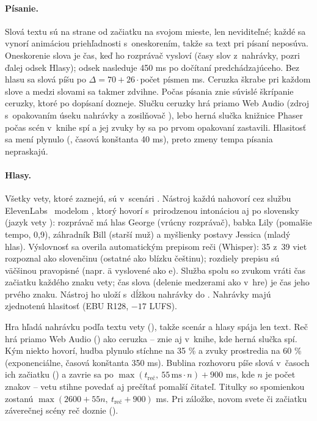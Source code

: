 \documentclass[11pt, a4paper]{article}
\begin{document}
\paragraph{Písanie.} Slová textu sú na strane od začiatku na svojom mieste, len neviditeľné;
každé sa vynorí animáciou priehľadnosti s~oneskorením, takže sa text pri písaní neposúva.
Oneskorenie slova je čas, keď ho rozprávač vysloví (časy slov z~nahrávky, pozri ďalej odsek
Hlasy); odsek nasleduje 450 ms po dočítaní predchádzajúceho. Bez hlasu sa slová píšu po
$\Delta = 70 + 26\cdot\text{počet písmen}$ ms. Ceruzka škrabe pri každom slove a medzi slovami
sa takmer zdvihne. Počas písania
znie súvislé škrípanie ceruzky, ktoré po dopísaní dozneje. Slučku ceruzky hrá priamo Web Audio
(zdroj  s~opakovaním úseku nahrávky a zosilňovač ),
lebo herná slučka knižnice Phaser počas scén v~knihe spí a jej zvuky by sa po prvom opakovaní
zastavili. Hlasitosť sa mení plynulo (, časová konštanta 40 ms), preto
zmeny tempa písania nepraskajú.

\paragraph{Hlasy.} Všetky vety, ktoré zaznejú, sú v~scenári . Nástroj
 každú nahovorí cez službu ElevenLabs~\cite{ElevenLabs} modelom
, ktorý hovorí s~prirodzenou intonáciou aj po slovensky (jazyk vety
): rozprávač má hlas George (vrúcny rozprávač), babka Lily (pomalšie tempo, 0,9),
záhradník Bill (starší muž) a myšlienky postavy Jessica (mladý hlas). Výslovnosť sa overila
automatickým prepisom reči (Whisper): 35 z~39 viet rozpoznal ako slovenčinu (ostatné ako
blízku češtinu); rozdiely prepisu sú väčšinou pravopisné (napr. ä vyslovené ako e). Služba
spolu so zvukom vráti čas začiatku každého znaku vety; čas slova (delenie medzerami ako
v~hre) je čas jeho prvého znaku. Nástroj ho uloží s~dĺžkou nahrávky do
. Nahrávky majú zjednotenú hlasitosť (EBU R128, $-17$ LUFS).

Hra hľadá nahrávku podľa textu vety (), takže scenár a hlasy
spája len text. Reč hrá priamo Web Audio () ako ceruzka – znie aj v~knihe, kde
herná slučka spí. Kým niekto hovorí, hudba plynulo stíchne na 35 \% a zvuky prostredia na 60 \%
(exponenciálne, časová konštanta 350 ms). Bublina rozhovoru píše slová v~časoch ich začiatku
() a zavrie sa po $\max(t_{\text{reč}},\ 55\,\text{ms} \cdot n) + 900$ ms,
kde $n$ je počet znakov – vetu stihne povedať aj prečítať pomalší čitateľ. Titulky so spomienkou
zostanú $\max(2600 + 55 n,\ t_{\text{reč}} + 900)$ ms. Pri záložke, novom svete či začiatku
záverečnej scény reč doznie ().
\end{document}
